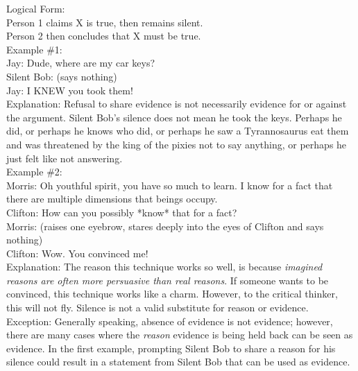 \documentclass[a4paper,12pt,single,pdftex]{scrartcl}
\begin{document}
    
      Logical Form:
    \\

    
      Person 1 claims X is true, then remains silent.
    \\

    
      Person 2 then concludes that X must be true.
    \\

    
      Example \#1:
    \\

    
      Jay: Dude, where are my car keys?
    \\

    
      Silent Bob: (says nothing)
    \\

    
      Jay: I KNEW you took them!
    \\

    
      Explanation: Refusal to share evidence is not necessarily evidence for or against the argument. Silent Bob’s silence does not mean he took the keys.  Perhaps he did, or perhaps he knows who did, or perhaps he saw a Tyrannosaurus eat them and was threatened by the king of the pixies not to say anything, or perhaps he just felt like not answering. 
    \\

    
      Example \#2:
    \\

    
      Morris: Oh youthful spirit, you have so much to learn.  I know for a fact that there are multiple dimensions that beings occupy.
    \\

    
      Clifton: How can you possibly *know* that for a fact?
    \\

    
      Morris: (raises one eyebrow, stares deeply into the eyes of Clifton and says nothing)
    \\

    
      Clifton: Wow. You convinced me!
    \\

    
      Explanation: The reason this technique works so well, is because {\it imagined reasons are often more persuasive than real reasons}.  If someone wants to be convinced, this technique works like a charm.  However, to the critical thinker, this will not fly.  Silence is not a valid substitute for reason or evidence.
    \\

    
      Exception: Generally speaking, absence of evidence is not evidence; however, there are many cases where the {\it reason} evidence is being held back can be seen as evidence.  In the first example, prompting Silent Bob to share a reason for his silence could result in a statement from Silent Bob that can be used as evidence.
    \\
\end{document}
